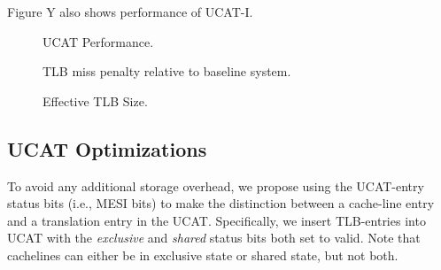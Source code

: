 Figure Y also shows performance of UCAT-I.

\begin{figure}[tp] 
  \vspace{-0.in} \centering
  \centerline{}

  \caption{\small UCAT Performance. \normalsize}
  \label{fig:perf_UCAT} 
  \vspace{0.2 in}
\end{figure}

\begin{figure}[tp] 
  \vspace{0.in} \centering
  \centerline{}

  \caption{\small TLB miss penalty relative to baseline system.\normalsize}
  \label{fig:tlblat_UCAT} 
  \vspace{-0.1 in}
\end{figure}

\begin{figure}[tp] 
  \vspace{0.in} \centering
  \centerline{}

  \caption{\small Effective TLB Size.\normalsize}
  \label{fig:tlblat_UCAT} 
  \vspace{-0.1 in}
\end{figure}


\subsection{UCAT Optimizations}

To avoid any additional storage overhead, we propose using the
UCAT-entry status bits (i.e., MESI bits) to make the distinction between 
a cache-line entry and a translation entry in the UCAT.
Specifically, we insert TLB-entries into UCAT with the {\em exclusive}
and {\em shared} status bits both set to valid. Note that cachelines can
either be in exclusive state or shared state, but not both.
